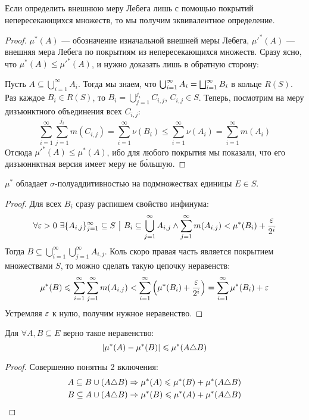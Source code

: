 \begin{proposition}
	Если определить внешнюю меру Лебега лишь с помощью покрытий непересекающихся множеств, то мы получим эквивалентное определение.
\end{proposition}

\begin{proof}
	$\mu^*(A)$ --- обозначение изначальной внешней меры Лебега, $\mu'^*(A)$ --- внешняя мера Лебега по покрытиям из непересекающихся множеств. Сразу ясно, что $\mu^*(A) \le \mu'^*(A)$, и нужно доказать лишь в обратную сторону:
	
	Пусть $A \subseteq \bigcup_{i = 1}^\infty A_i$. Тогда мы знаем, что $\bigcup_{i = 1}^\infty A_i = \bigsqcup_{i = 1}^\infty B_i$ в кольце $R(S)$. Раз каждое $B_i \in R(S)$, то $B_i = \bigcup_{j = 1}^{j_i} C_{i, j}$, $C_{i, j} \in S$. Теперь, посмотрим на меру дизъюнктного объединения всех $C_{i, j}$:
	\[
		\sum_{i = 1}^\infty \sum_{j = 1}^{j_i} m(C_{i, j}) = \sum_{i = 1}^\infty \nu(B_i) \le \sum_{i = 1}^\infty \nu(A_i) = \sum_{i = 1}^\infty m(A_i)
	\]
	Отсюда $\mu'^*(A) \le \mu^*(A)$, ибо для любого покрытия мы показали, что его дизъюннктная версия имеет меру не б\'{о}льшую.
\end{proof}

\begin{theorem}
	$\mu^*$ обладает $\sigma$-полуаддитивностью на подмножествах единицы $E \in S$.
\end{theorem}

\begin{proof}
	Для всех $B_i$ сразу распишем свойство инфинума:
	\[
		\forall \varepsilon > 0\ \exists \{A_{i, j}\}_{j = 1}^\infty \subseteq S \ \big|\  B_i \subseteq \bigcup_{j = 1}^\infty A_{i, j} \wedge \sum_{j = 1}^\infty m(A_{i, j}) < \mu^*(B_i) + \frac{\varepsilon}{2^i}
	\]
	Тогда $B \subseteq \bigcup_{i = 1}^\infty \bigcup_{j = 1}^\infty A_{i, j}$. Коль скоро правая часть является покрытием множествами $S$, то можно сделать такую цепочку неравенств:
	\[
		\mu^*(B) \leqslant \sum_{i = 1}^\infty \sum_{j = 1}^\infty m(A_{i, j}) < \sum_{i = 1}^\infty \left(\mu^*(B_i) + \frac{\varepsilon}{2^i}\right) = \sum_{i = 1}^\infty \mu^*(B_i) + \varepsilon
	\]
	Устремляя $\varepsilon$ к нулю, получим нужное неравенство.
\end{proof}

\begin{corollary}
	Для $\forall A, B \subseteq E$ верно такое неравенство:
	\[
		|\mu^*(A) - \mu^*(B)| \leqslant \mu^*(A \triangle B)
	\]
\end{corollary}

\begin{proof}
	Совершенно понятны 2 включения:
	\begin{align*}
		&{A \subseteq B \cup (A \triangle B) \Rightarrow \mu^*(A) \leqslant \mu^*(B) + \mu^*(A \triangle B)}
		\\
		&{B \subseteq A \cup (A \triangle B) \Rightarrow \mu^*(B) \leqslant \mu^*(A) + \mu^*(A \triangle B)}
	\end{align*}
\end{proof}

